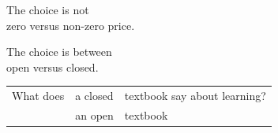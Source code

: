 \documentclass[14pt]{beamer}
\begin{document}


\begin{frame}
  \Large

  The choice is not \\
  \quad zero versus non-zero price.

  The choice is between \\
  \quad open versus closed. 

  \large
  \vfill\pause
  \begin{tabular}{l@{ }l@{ }l}
    What does & a closed & textbook say about learning? \pause\\
    &an open& textbook 
  \end{tabular}
  
\end{frame}
\end{document}
